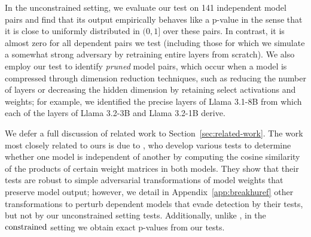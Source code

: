In the unconstrained setting, we evaluate our test on 141 independent model pairs and find that its output empirically behaves like a p-value in the sense that it is close to uniformly distributed in $(0,1]$ over these pairs.
In contrast, it is almost zero for all dependent pairs we test (including those for which we simulate a somewhat strong adversary by retraining entire layers from scratch).
We also employ our test to identify \textit{pruned} model pairs, which occur when a model is compressed through dimension reduction techniques, such as reducing the number of layers or decreasing the hidden dimension by retaining select activations and weights; for example, we identified the precise layers of Llama 3.1-8B from which each of the layers of Llama 3.2-3B and Llama 3.2-1B derive.

We defer a full discussion of related work to Section~\ref{sec:related-work}. The work most closely related to ours is due to \citet{zeng2024humanreadablefingerprintlargelanguage}, who develop various tests to determine whether one model
is independent of another by computing the cosine similarity of the products of certain weight matrices in both models.
They show that their tests are robust to simple adversarial transformations of model weights that preserve model output;
however, we detail in Appendix~\ref{app:breakhuref} other transformations to perturb dependent models that evade detection by their tests, but not by our unconstrained setting tests. 
Additionally, unlike \citet{zeng2024humanreadablefingerprintlargelanguage}, in the $\textup{constrained}$ setting we obtain exact p-values from our tests. 
